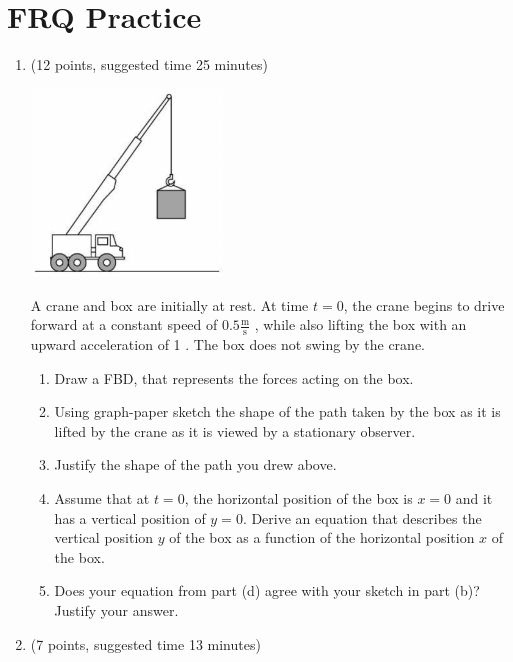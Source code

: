\documentclass[12pt]{article}
\begin{document}
\section{FRQ Practice}
\begin{enumerate}
    \item (12 points, suggested time 25 minutes)
    \begin{center}
        \includegraphics[width=2in]{Screenshot 2022-11-06 at 22.18.57.png}
    \end{center}
    A crane and box are initially at rest. At time $t=0$, the crane begins to drive forward at a constant speed of $0.5 \frac{\text{m}}{\text{s}}$ , while also lifting the box with an upward acceleration of 1 \ms. The box does not swing by the crane. 
    \begin{enumerate}
        \item Draw a FBD, that represents the forces acting on the box.
        \item Using graph-paper sketch the shape of the path taken by the box as it is lifted by the crane as it is viewed by a stationary observer.
        \item Justify the shape of the path you drew above. 
        \item Assume that at $t=0$, the horizontal position of the box is $x=0$ and it has a vertical position of $y=0$. Derive an equation that describes the vertical position $y$ of the box as a function of the horizontal position $x$ of the box.
        \item Does your equation from part (d) agree with your sketch in part (b)? Justify your answer. 
    \end{enumerate}
    \newpage
\item (7 points, suggested time 13 minutes)


\end{enumerate}
\end{document}
